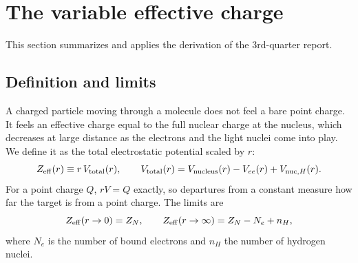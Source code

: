\documentclass[11pt,a4paper]{article}
\begin{document}
\section{The variable effective charge}\label{sec:zeff}
This section summarizes and applies the derivation of the 3rd-quarter report.

\subsection{Definition and limits}
A charged particle moving through a molecule does not feel a bare point charge. It feels an
effective charge equal to the full nuclear charge at the nucleus, which decreases at large
distance as the electrons and the light nuclei come into play. We define it as the total
electrostatic potential scaled by $r$:
\begin{equation}
Z_{\rm eff}(r)\equiv r\,V_{\rm total}(r),\qquad
V_{\rm total}(r)=V_{\rm nucleus}(r)-V_{ee}(r)+V_{{\rm nuc},H}(r).
\end{equation}
For a point charge $Q$, $rV=Q$ exactly, so departures from a constant measure how far the target
is from a point charge. The limits are
\begin{equation}
Z_{\rm eff}(r\to0)=Z_N,\qquad Z_{\rm eff}(r\to\infty)=Z_N-N_e+n_H ,
\end{equation}
where $N_e$ is the number of bound electrons and $n_H$ the number of hydrogen nuclei.
\end{document}
